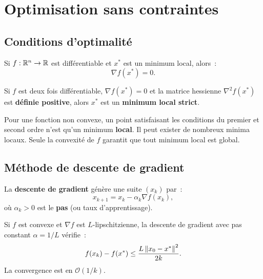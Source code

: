 \section{Optimisation sans contraintes}

\subsection{Conditions d'optimalit\'e}

\begin{theoreme}
Si $f : \mathbb{R}^n \to \mathbb{R}$ est diff\'erentiable et $x^*$ est un minimum local, alors~:
\[
  \nabla f(x^*) = 0.
\]
\end{theoreme}

\begin{theoreme}
Si $f$ est deux fois diff\'erentiable, $\nabla f(x^*) = 0$ et la matrice
hessienne $\nabla^2 f(x^*)$ est \textbf{d\'efinie positive}, alors $x^*$ est
un \textbf{minimum local strict}.
\end{theoreme}

\begin{attention}[title=\textbf{Minima locaux vs globaux}]
Pour une fonction non convexe, un point satisfaisant les conditions du
premier et second ordre n'est qu'un minimum \textbf{local}. Il peut exister
de nombreux minima locaux. Seule la convexit\'e de $f$ garantit que tout
minimum local est global.
\end{attention}

\subsection{M\'ethode de descente de gradient}

\begin{definition}
La \textbf{descente de gradient} g\'en\`ere une suite $(x_k)$ par~:
\[
  x_{k+1} = x_k - \alpha_k \nabla f(x_k),
\]
o\`u $\alpha_k > 0$ est le \textbf{pas} (ou taux d'apprentissage).
\end{definition}

\begin{theoreme}
Si $f$ est convexe et $\nabla f$ est $L$-lipschitzienne, la descente de
gradient avec pas constant $\alpha = 1/L$ v\'erifie~:
\[
  f(x_k) - f(x^*) \leq \frac{L \left\| x_0 - x^* \right\|^2}{2k}.
\]
La convergence est en $\mathcal{O}(1/k)$.
\end{theoreme}

